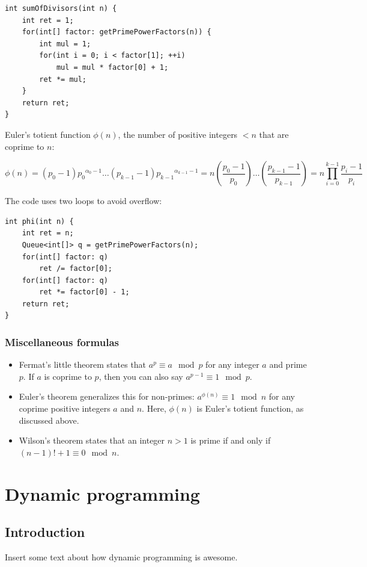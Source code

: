 \documentclass[a4paper,12pt]{article}
\begin{document}
\begin{lstlisting}
int sumOfDivisors(int n) {
	int ret = 1;
	for(int[] factor: getPrimePowerFactors(n)) {
		int mul = 1;
		for(int i = 0; i < factor[1]; ++i)
			mul = mul * factor[0] + 1;
		ret *= mul;
	}
	return ret;
}
\end{lstlisting}

\noindent Euler's totient function $\phi(n)$, the number of positive integers $<n$ that are coprime to $n$:

\[\phi(n) = (p_0 - 1){p_0}^{\alpha_0-1}\ldots(p_{k-1} - 1){p_{k-1}}^{\alpha_{k-1}-1} = n\left(\frac{p_0-1}{p_0}\right)\ldots\left(\frac{p_{k-1}-1}{p_{k-1}}\right) = n\prod_{i=0}^{k-1}{\frac{p_i - 1}{p_i}} \]

\noindent The code uses two loops to avoid overflow:

\begin{lstlisting}
int phi(int n) {
	int ret = n;
	Queue<int[]> q = getPrimePowerFactors(n);
	for(int[] factor: q)
		ret /= factor[0];
	for(int[] factor: q)
		ret *= factor[0] - 1;
	return ret;
}
\end{lstlisting}

\subsubsection{Miscellaneous formulas}
\begin{itemize}
\item Fermat's little theorem states that $a^p \equiv a \mod{p}$ for any integer $a$ and prime $p$. If $a$ is coprime to $p$, then you can also say $a^{p-1} \equiv 1 \mod{p}$.
\item Euler's theorem generalizes this for non-primes: $a^{\phi(n)} \equiv 1 \mod{n}$ for any coprime positive integers $a$ and $n$. Here, $\phi(n)$ is Euler's totient function, as discussed above.
\item Wilson's theorem states that an integer $n>1$ is prime if and only if $(n-1)!+1 \equiv 0 \mod{n}$.
\end{itemize}

\newpage\section{Dynamic programming}

\subsection{Introduction}

Insert some text about how dynamic programming is awesome.
\end{document}
